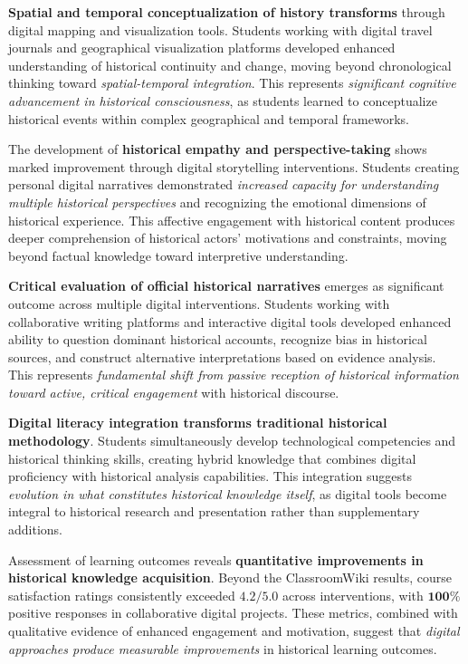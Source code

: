 \documentclass[
hf,
]{ceurart}
\begin{document}
\textbf{Spatial and temporal conceptualization of history transforms} through digital mapping and visualization tools. Students working with digital travel journals and geographical visualization platforms developed {enhanced understanding of historical continuity and change}, moving beyond chronological thinking toward \textit{spatial-temporal integration}. This represents \textit{significant cognitive advancement in historical consciousness}, as students learned to conceptualize historical events within complex geographical and temporal frameworks.

The development of \textbf{historical empathy and perspective-taking} shows marked improvement through digital storytelling interventions. Students creating personal digital narratives demonstrated \textit{increased capacity for understanding multiple historical perspectives} and recognizing the emotional dimensions of historical experience. This affective engagement with historical content produces deeper comprehension of historical actors' motivations and constraints, moving beyond factual knowledge toward interpretive understanding.

\textbf{Critical evaluation of official historical narratives} emerges as significant outcome across multiple digital interventions. Students working with collaborative writing platforms and interactive digital tools developed enhanced ability to question dominant historical accounts, recognize bias in historical sources, and construct alternative interpretations based on evidence analysis. This represents \textit{fundamental shift from passive reception of historical information toward active, critical engagement} with historical discourse.

\textbf{Digital literacy integration transforms traditional historical methodology}. Students simultaneously develop technological competencies and historical thinking skills, creating hybrid knowledge that combines digital proficiency with historical analysis capabilities. This integration suggests \textit{evolution in what constitutes historical knowledge itself}, as digital tools become integral to historical research and presentation rather than supplementary additions.

Assessment of learning outcomes reveals \textbf{quantitative improvements in historical knowledge acquisition}. Beyond the ClassroomWiki results, course satisfaction ratings consistently exceeded \textit{$\mathbf{4.2/5.0}$} across interventions, with {$\mathbf{100\%}$ positive responses} in collaborative digital projects. These metrics, combined with qualitative evidence of enhanced engagement and motivation, suggest that \textit{digital approaches produce measurable improvements} in historical learning outcomes.
\end{document}
